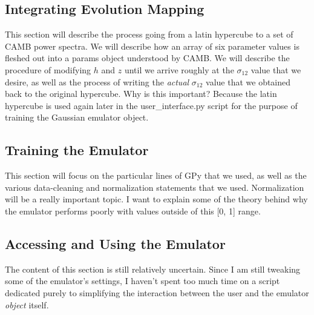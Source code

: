 \documentclass[11pt]{article}
\begin{document}
\begin{centering}
\subsection{Integrating Evolution Mapping}
\end{centering}


This section will describe the process going from a latin hypercube to a set of CAMB power spectra. We will describe how an array of six parameter values is fleshed out into a params object understood by CAMB. We will describe the procedure of modifying $h$ and $z$ until we arrive roughly at the $\sigma_{12}$ value that we desire, as well as the process of writing the \textit{actual} $\sigma_{12}$ value that we obtained back to the original hypercube. Why is this important? Because the latin hypercube is used again later in the user\_interface.py script for the purpose of training the Gaussian emulator object.

\begin{centering}
\subsection{Training the Emulator}
\label{sec: emu_training}
\end{centering}


This section will focus on the particular lines of GPy that we used, as well
as the various data-cleaning and normalization statements that we used.
Normalization will be a really important topic. I want to explain some of
the theory behind why the emulator performs poorly with values outside of this
[0, 1] range.

\begin{centering}
\subsection{Accessing and Using the Emulator}
\end{centering}


The content of this section is still relatively uncertain. Since I am still tweaking some of the emulator's settings, I haven't spent too much time on a script dedicated purely to simplifying the interaction between the user and the emulator \textit{object} itself.
\end{document}
